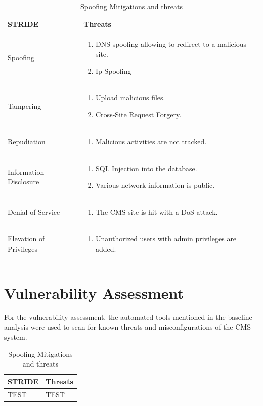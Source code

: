 \begingroup
\centering
\setlength{\tabcolsep}{6.5pt} %
\renewcommand{\arraystretch}{1.8} %
\begin{longtable}{ |p{7cm}| p{8cm} |}
\caption{Spoofing Mitigations and threats}
    \label{table:spoofing}
\hline
\rowcolor{grey!15}
\textbf{STRIDE} & \textbf{Threats}\\
\hline
Spoofing & \begin{enumerate}
    \item DNS spoofing allowing to redirect to a malicious site.
    \item Ip Spoofing \citep[p.~2]{ip_spoofing}
\end{enumerate} \\
\hline
Tampering & \begin{enumerate}
    \item Upload malicious files.
    \item Cross-Site Request Forgery. \citep[p.~538]{crsf}
\end{enumerate} \\
\hline
Repudiation & \begin{enumerate}
    \item Malicious activities are not tracked.
\end{enumerate} \\
\hline
Information Disclosure & \begin{enumerate}
    \item SQL Injection into the database.
    \item Various network information is public.
\end{enumerate} \\
\hline
Denial of Service & \begin{enumerate}
    \item The CMS site is hit with a DoS attack.
\end{enumerate} \\
\hline
Elevation of Privileges & \begin{enumerate}
    \item Unauthorized users with admin privileges are added.
\end{enumerate} \\
\hline
\end{longtable}
\endgroup

\section{Vulnerability Assessment}
For the vulnerability assessment, the automated tools mentioned in the baseline analysis were used to scan for known threats and misconfigurations of the CMS system.

\begingroup
\centering
\setlength{\tabcolsep}{6.5pt} %
\renewcommand{\arraystretch}{1.8} %
\begin{longtable}{ |p{7cm}| p{8cm} |}
\caption{Spoofing Mitigations and threats}
    \label{table:spoofing}
\hline
\rowcolor{grey!15}
\textbf{STRIDE}  & \textbf{Threats}\\
\hline
TEST &  TEST\\
\hline
\end{longtable}
\endgroup